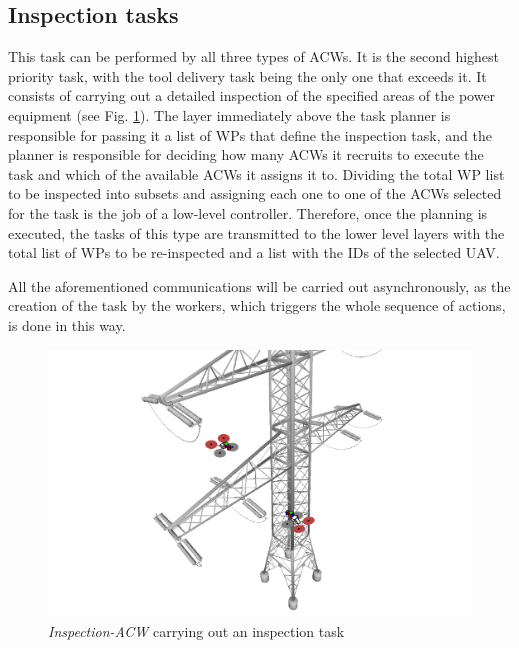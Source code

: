 \subsection{Inspection tasks}
\label{subsec:InspectionTasks}
This task can be performed by all three types of \glspl{ACW}. It is the second highest priority task, with the tool delivery task being the only one that exceeds it. It consists of carrying out a detailed inspection of the specified areas of the power equipment (see Fig. \ref{fig:inspection_task}). The layer immediately above the task planner is responsible for passing it a list of \glspl{WP} that define the inspection task, and the planner is responsible for deciding how many \glspl{ACW} it recruits to execute the task and which of the available \glspl{ACW} it assigns it to. Dividing the total \gls{WP} list to be inspected into subsets and assigning each one to one of the \glspl{ACW} selected for the task is the job of a low-level controller. Therefore, once the planning is executed, the tasks of this type are transmitted to the lower level layers with the total list of \glspl{WP} to be re-inspected and a list with the \glspl{ID} of the selected \gls{UAV}.

All the aforementioned communications will be carried out asynchronously, as the creation of the task by the workers, which triggers the whole sequence of actions, is done in this way.

\begin{figure}[htbp]
    \centering
    \includegraphics[width=.75\linewidth]
    {ProblemFormulation/figures/inspection_task.pdf}
    \caption{\textit{Inspection-ACW} carrying out an inspection task}
    \label{fig:inspection_task}
\end{figure}

